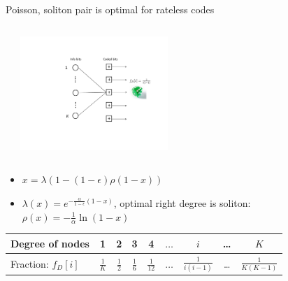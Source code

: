 \begin{frame}{Poisson, soliton pair is optimal for rateless codes}
\vspace{-3mm}
\begin{columns}
\begin{center}
\scalebox{0.45}{}
\end{center}
\begin{center}
  \includegraphics[width=2.2in]{./Figures/ratelesserasures3}
\end{center}
\end{columns}
\begin{itemize}
  \item   $x = \lambda(1-(1-\epsilon)\rho(1-x))$
  \item $\lambda(x) = e^{-\frac{\alpha}{1-\epsilon}(1-x)}$, \alert{optimal right degree is soliton: $\rho(x) = -\frac{1}{\alpha}\ln(1-x)$}
\end{itemize}
\begin{center}
\begin{tabular}{|l|c|c|c|c|c|c|c|c|}
\hline
Degree of nodes & 1 & 2 & 3 & 4 & $\ldots$ & $i$ & \ldots & $K$ \\
\hline
Fraction: \alert{ $f_D[i]$ } & $\frac{1}{K}$ & $\frac12$ & $\frac16$ & $\frac{1}{12}$ & $\ldots$ & $\frac{1}{i(i-1)}$ & \ldots & $\frac{1}{K (K-1)}$ \\
\hline
\end{tabular}
\end{center}
\end{frame}
